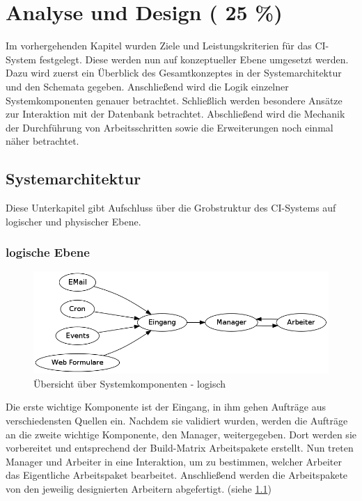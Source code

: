 \chapter{Analyse und Design ( 25 \%)}
\label{chap:design}

Im vorhergehenden Kapitel wurden Ziele und Leistungskriterien
für das \ac{CI}-System festgelegt.
Diese werden nun auf konzeptueller Ebene umgesetzt werden.
Dazu wird zuerst ein Überblick des Gesamtkonzeptes in der Systemarchitektur und den Schemata gegeben.
Anschließend wird die Logik einzelner Systemkomponenten genauer betrachtet.
Schließlich werden besondere Ansätze zur Interaktion mit der Datenbank betrachtet.
Abschließend wird die Mechanik der Durchführung von Arbeitsschritten sowie die Erweiterungen noch einmal näher betrachtet.



\section{Systemarchitektur}
\label{sec:design:sysarch}
Diese Unterkapitel gibt Aufschluss über die Grobstruktur des \ac{CI}-Systems auf logischer und physischer Ebene.

\subsection{logische Ebene}

\begin{figure}[ht]
  \centering
  \includegraphics[width=\textwidth]{imageinput/grob-layout-komponenten-logisch.png}
  \caption{\"Ubersicht über Systemkomponenten - logisch}
  \label{fig:grob-layout-komponenten-logisch}
\end{figure}


Die erste wichtige Komponente ist der Eingang,
in ihm gehen Aufträge aus verschiedensten Quellen ein.
Nachdem sie validiert wurden, werden die Aufträge an
die zweite wichtige Komponente, den Manager, weitergegeben.
Dort werden sie vorbereitet und entsprechend der Build-Matrix Arbeitspakete erstellt.
Nun treten Manager und Arbeiter in eine Interaktion,
um zu bestimmen, welcher Arbeiter das Eigentliche Arbeitspaket bearbeitet.
Anschließend werden die Arbeitspakete von den jeweilig designierten Arbeitern abgefertigt. (siehe \cref{fig:grob-layout-komponenten-logisch})

